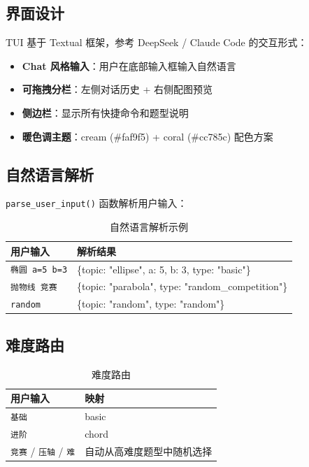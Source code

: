 \documentclass[11pt,a4paper]{article}
\begin{document}
\subsection{界面设计}

TUI 基于 Textual 框架，参考 DeepSeek / Claude Code 的交互形式：

\begin{itemize}
    \item \textbf{Chat 风格输入}：用户在底部输入框输入自然语言
    \item \textbf{可拖拽分栏}：左侧对话历史 + 右侧配图预览
    \item \textbf{侧边栏}：显示所有快捷命令和题型说明
    \item \textbf{暖色调主题}：cream (\#faf9f5) + coral (\#cc785c) 配色方案
\end{itemize}

\subsection{自然语言解析}

\texttt{parse\_user\_input()} 函数解析用户输入：

\begin{table}[h]
\centering
\begin{tabular}{ll}
\toprule
用户输入 & 解析结果 \\
\midrule
\texttt{椭圆 a=5 b=3} & \{topic: "ellipse", a: 5, b: 3, type: "basic"\} \\
\texttt{抛物线 竞赛} & \{topic: "parabola", type: "random\_competition"\} \\
\texttt{random} & \{topic: "random", type: "random"\} \\
\bottomrule
\end{tabular}
\caption{自然语言解析示例}
\end{table}

\subsection{难度路由}

\begin{table}[h]
\centering
\begin{tabular}{ll}
\toprule
用户输入 & 映射 \\
\midrule
\texttt{基础} & basic \\
\texttt{进阶} & chord \\
\texttt{竞赛} / \texttt{压轴} / \texttt{难} & 自动从高难度题型中随机选择 \\
\bottomrule
\end{tabular}
\caption{难度路由}
\end{table}
\end{document}
